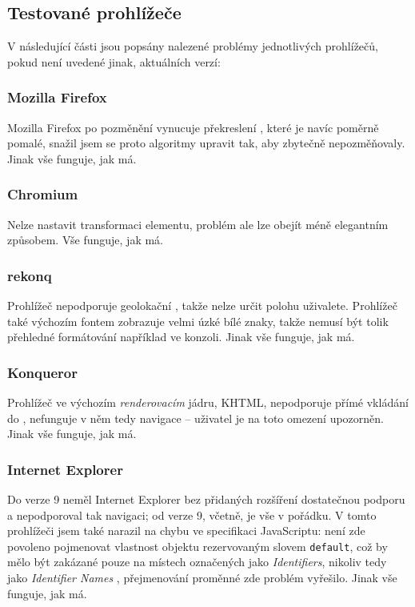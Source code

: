 \subsection{Testované prohlížeče}
V následující části jsou popsány nalezené problémy jednotlivých prohlížečů, pokud není uvedené jinak, aktuálních verzí:

\subsubsection{Mozilla Firefox}
Mozilla Firefox po pozměnění vynucuje překreslení , které je navíc poměrně pomalé, snažil jsem se proto algoritmy upravit tak, aby  zbytečně nepozměňovaly. Jinak vše funguje, jak má.

\subsubsection{Chromium}
Nelze nastavit transformaci  elementu, problém ale lze obejít méně elegantním způsobem. Vše funguje, jak má.

\subsubsection{rekonq}
Prohlížeč nepodporuje geolokační , takže nelze určit polohu uživalete. Prohlížeč také výchozím fontem zobrazuje velmi úzké bílé znaky, takže nemusí být tolik přehledné formátování například ve  konzoli. Jinak vše funguje, jak má.

\subsubsection{Konqueror}
Prohlížeč ve výchozím \textit{renderovacím} jádru, KHTML, nepodporuje přímé vkládání  do , nefunguje v něm tedy navigace -- uživatel je na toto omezení upozorněn. Jinak vše funguje, jak má.

\subsubsection{Internet Explorer}
Do verze 9 neměl Internet Explorer bez přidaných rozšíření dostatečnou podporu  a nepodporoval tak navigaci; od verze 9, včetně, je vše v pořádku. V tomto prohlížeči jsem také narazil na chybu ve specifikaci JavaScriptu: není zde povoleno pojmenovat vlastnost objektu rezervovaným slovem \texttt{default}, což by mělo být zakázané pouze na místech označených jako \textit{Identifiers}, nikoliv tedy jako \textit{Identifier Names} \cite{JsIdentifiers}, přejmenování proměnné zde problém vyřešilo. Jinak vše funguje, jak má.

